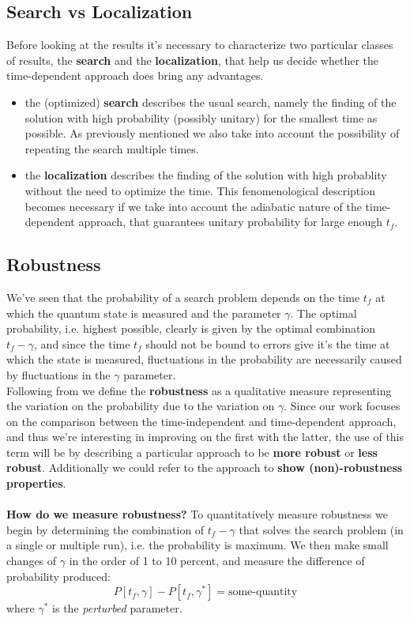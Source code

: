     \subsection{Search vs Localization}
      Before looking at the results it's necessary to characterize two particular classes of results, the \textbf{search} and the \textbf{localization}, that help us decide whether the time-dependent approach does bring any advantages.
      \begin{itemize}
          \item the (optimized) \textbf{search} describes the usual search, namely the finding of the solution with high probability (possibly unitary) for the smallest time as possible. As previously mentioned we also take into account the possibility of repeating the search multiple times.
          \item the \textbf{localization} describes the finding of the solution with high probablity without the need to optimize the time. This fenomenological description becomes necessary if we take into account the adiabatic nature of the time-dependent approach, that guarantees unitary probability for large enough $t_f$.
      \end{itemize}

    \subsection{Robustness}
        We've seen that the probability of a search problem depends on the time $t_f$ at which the quantum state is measured and the parameter $\gamma$. The optimal probability, i.e. highest possible, clearly is given by the optimal combination $t_f-\gamma$, and since the time $t_f$ should not be bound to errors give it's the time at which the state is measured, fluctuations in the probability are necessarily caused by fluctuations in the $\gamma$ parameter. \\
        Following from \cite{SH.HungS.Hietala2019} we define the \textbf{robustness} as a qualitative measure representing the variation on the probability due to the variation on $\gamma$. Since our work focuses on the comparison between the time-independent and time-dependent approach, and thus we're interesting in improving on the first with the latter, the use of this term will be by describing a particular approach to be \textbf{more robust} or \textbf{less robust}. Additionally we could refer to the approach to \textbf{show (non)-robustness properties}. \\ \\
        \textbf{How do we measure robustness?} To quantitatively measure robustness we begin by determining the combination of $t_f-\gamma$ that solves the search problem (in a single or multiple run), i.e. the probability is maximum. We then make small changes of $\gamma$ in the order of 1 to 10 percent, and measure the difference of probability produced:
        \begin{equation}
            P[t_f, \gamma] - P[t_f, \gamma^*]  = \mbox{some-quantity}
        \end{equation}
        where $\gamma^*$ is the \textit{perturbed} parameter.


